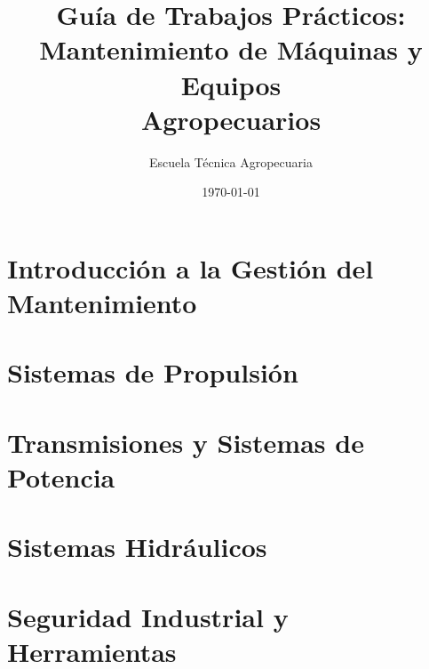 \documentclass[a4paper,12pt]{book}
\title{Guía de Trabajos Prácticos: \\
  Mantenimiento de Máquinas y Equipos \\
Agropecuarios}
\author{Escuela Técnica Agropecuaria}
\date{\today}
\begin{document}
\maketitle

\tableofcontents

\chapter{Introducción a la Gestión del Mantenimiento}


\chapter{Sistemas de Propulsión}


\chapter{Transmisiones y Sistemas de Potencia}


\chapter{Sistemas Hidráulicos}


\chapter{Seguridad Industrial y Herramientas}

\end{document}
